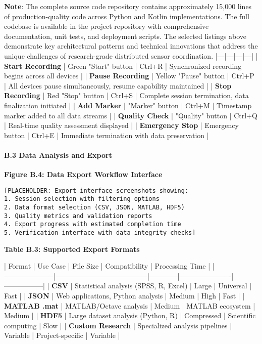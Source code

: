 \documentclass[11pt,a4paper]{report}
\begin{document}
\textbf{Note}: The complete source code repository contains approximately 15,000 lines of production-quality code across
Python and Kotlin implementations. The full codebase is available in the project repository with comprehensive
documentation, unit tests, and deployment scripts. The selected listings above demonstrate key architectural patterns
and technical innovations that address the unique challenges of research-grade distributed sensor coordination.
|---|---|---|---|
| \textbf{Start Recording} | Green "Start" button | Ctrl+R | Synchronized recording begins across all devices |
| \textbf{Pause Recording} | Yellow "Pause" button | Ctrl+P | All devices pause simultaneously, resume capability
maintained |
| \textbf{Stop Recording} | Red "Stop" button | Ctrl+S | Complete session termination, data finalization initiated |
| \textbf{Add Marker} | "Marker" button | Ctrl+M | Timestamp marker added to all data streams |
| \textbf{Quality Check} | "Quality" button | Ctrl+Q | Real-time quality assessment displayed |
| \textbf{Emergency Stop} | Emergency button | Ctrl+E | Immediate termination with data preservation |

\paragraph{B.3 Data Analysis and Export}

\textbf{Figure B.4: Data Export Workflow Interface}

\begin{verbatim}
[PLACEHOLDER: Export interface screenshots showing:
1. Session selection with filtering options
2. Data format selection (CSV, JSON, MATLAB, HDF5)
3. Quality metrics and validation reports
4. Export progress with estimated completion time
5. Verification interface with data integrity checks]
\end{verbatim}

\textbf{Table B.3: Supported Export Formats}

| Format              | Use Case                              | File Size  | Compatibility        | Processing Time |
|---------------------|---------------------------------------|------------|----------------------|-----------------|
| \textbf{CSV}             | Statistical analysis (SPSS, R, Excel) | Large      | Universal            | Fast            |
| \textbf{JSON}            | Web applications, Python analysis     | Medium     | High                 | Fast            |
| \textbf{MATLAB .mat}     | MATLAB/Octave analysis                | Medium     | MATLAB ecosystem     | Medium          |
| \textbf{HDF5}            | Large dataset analysis (Python, R)    | Compressed | Scientific computing | Slow            |
| \textbf{Custom Research} | Specialized analysis pipelines        | Variable   | Project-specific     | Variable        |
\end{document}
